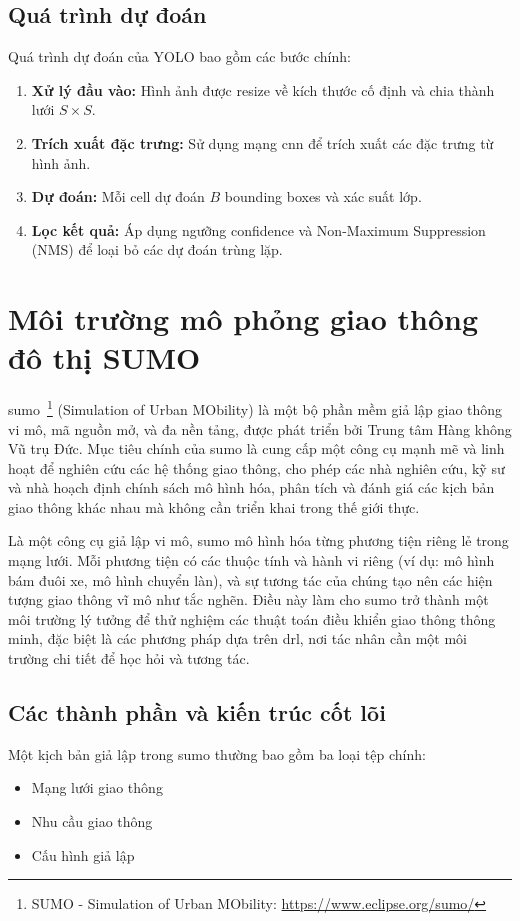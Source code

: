 \subsection{Quá trình dự đoán}
Quá trình dự đoán của YOLO bao gồm các bước chính:
\begin{enumerate}
    \item \textbf{Xử lý đầu vào:} Hình ảnh được resize về kích thước cố định và
        chia thành lưới $S \times S$.

    \item \textbf{Trích xuất đặc trưng:} Sử dụng mạng \ac{cnn} để trích xuất các
        đặc trưng từ hình ảnh.

    \item \textbf{Dự đoán:} Mỗi cell dự đoán $B$ bounding boxes và xác suất lớp.

    \item \textbf{Lọc kết quả:} Áp dụng ngưỡng confidence và Non-Maximum
        Suppression (NMS) để loại bỏ các dự đoán trùng lặp.
\end{enumerate}

\section{Môi trường mô phỏng giao thông đô thị SUMO}
\ac{sumo}~\footnote{SUMO - Simulation of Urban MObility: \url{https://www.eclipse.org/sumo/}} (Simulation of Urban MObility) là một bộ phần mềm giả lập giao thông vi
mô, mã nguồn mở, và đa nền tảng, được phát triển bởi Trung tâm Hàng không Vũ trụ
Đức. Mục tiêu chính của \ac{sumo} là cung cấp một công cụ mạnh mẽ và linh hoạt
để nghiên cứu các hệ thống giao thông, cho phép các nhà nghiên cứu, kỹ sư và nhà
hoạch định chính sách mô hình hóa, phân tích và đánh giá các kịch bản giao thông
khác nhau mà không cần triển khai trong thế giới thực.

Là một công cụ giả lập vi mô, \ac{sumo} mô hình hóa từng phương tiện riêng lẻ trong
mạng lưới. Mỗi phương tiện có các thuộc tính và hành vi riêng (ví dụ: mô hình
bám đuôi xe, mô hình chuyển làn), và sự tương tác của chúng tạo nên các hiện tượng
giao thông vĩ mô như tắc nghẽn. Điều này làm cho \ac{sumo} trở thành một môi trường
lý tưởng để thử nghiệm các thuật toán điều khiển giao thông thông minh, đặc biệt
là các phương pháp dựa trên \ac{drl}, nơi tác nhân cần một môi trường chi tiết
để học hỏi và tương tác.

\subsection{Các thành phần và kiến trúc cốt lõi}
Một kịch bản giả lập trong \ac{sumo} thường bao gồm ba loại tệp chính:
\begin{itemize}
    \item Mạng lưới giao thông

    \item Nhu cầu giao thông

    \item Cấu hình giả lập
\end{itemize}

